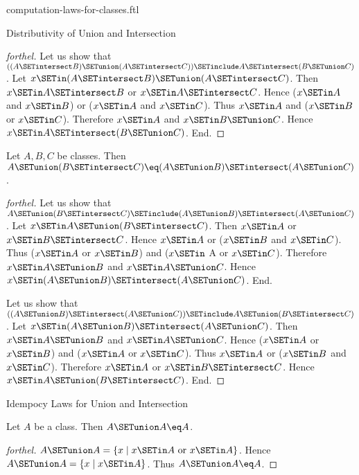 \documentclass{stex}
\begin{document}
\begin{smodule}{computation-laws-for-classes.ftl}
\begin{sfragment}{Distributivity of Union and Intersection}
\begin{proof}[forthel]
    Let us show that $((A \SETintersect B) \SETunion (A \SETintersect C)) \SETinclude A \SETintersect (B \SETunion C)$. %
      Let $x \SETin (A \SETintersect B) \SETunion (A \SETintersect C)$.
      Then $x \SETin A \SETintersect B$ or $x \SETin A \SETintersect C$.
      Hence ($x \SETin A$ and $x \SETin B$) or ($x \SETin A$ and $x \SETin C$).
      Thus $x \SETin A$ and ($x \SETin B$ or $x \SETin C$).
      Therefore $x \SETin A$ and $x \SETin B \SETunion C$.
      Hence$ x \SETin A \SETintersect (B \SETunion C)$.
    End.
  \end{proof}

  \begin{proposition}[forthel,id=FOUNDATIONS_02_5937390721957888]
    Let $A, B, C$ be classes.
    Then $A \SETunion (B \SETintersect C) \eq (A \SETunion B) \SETintersect (A \SETunion C)$.
  \end{proposition}
  \begin{proof}[forthel]
    Let us show that $A \SETunion (B \SETintersect C) \SETinclude (A \SETunion B) \SETintersect (A \SETunion C)$.
      Let $x \SETin A \SETunion (B \SETintersect C)$.
      Then $x \SETin A$ or $x \SETin B \SETintersect C$.
      Hence $x \SETin A$ or ($x \SETin B$ and $x \SETin C$).
      Thus ($x \SETin A$ or $x \SETin B$) and ($x \SETin$ A or $x \SETin C$).
      Therefore $x \SETin A \SETunion B$ and $x \SETin A \SETunion C$.
      Hence $x \SETin (A \SETunion B) \SETintersect (A \SETunion C)$.
    End.

    Let us show that $((A \SETunion B) \SETintersect (A \SETunion C)) \SETinclude A \SETunion (B \SETintersect C)$. %
      Let $x \SETin (A \SETunion B) \SETintersect (A \SETunion C)$.
      Then $x \SETin A \SETunion B$ and $x \SETin A \SETunion C$.
      Hence ($x \SETin A$ or $x \SETin B$) and ($x \SETin A$ or $x \SETin C$).
      Thus $x \SETin A$ or ($x \SETin B$ and $x \SETin C$).
      Therefore $x \SETin A$ or $x \SETin B \SETintersect C$.
      Hence $x \SETin A \SETunion (B \SETintersect C)$.
    End.
  \end{proof}
\end{sfragment}

\begin{sfragment}{Idempocy Laws for Union and Intersection}
  \begin{proposition}[forthel,id=FOUNDATIONS_02_2096996737351680]
    Let $A$ be a class.
    Then $A \SETunion A \eq A$.
  \end{proposition}
  \begin{proof}[forthel]
    $A \SETunion A = \{x \mid x \SETin A\text{ or }x \SETin A \}$.
    Hence $A \SETunion A = \{ x \mid x \SETin A \}$.
    Thus $A \SETunion A \eq A$.
  \end{proof}


\end{sfragment}
\end{smodule}
\end{document}
